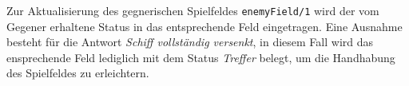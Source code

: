 	Zur Aktualisierung des gegnerischen Spielfeldes \texttt{enemyField/1} wird der vom Gegener erhaltene Status in das entsprechende 
	Feld eingetragen. Eine Ausnahme besteht für die Antwort \textit{Schiff vollständig versenkt}, in diesem Fall wird das ensprechende
	Feld lediglich mit dem Status \textit{Treffer} belegt, um die Handhabung des Spielfeldes zu erleichtern. 

	

	
	
	
	

